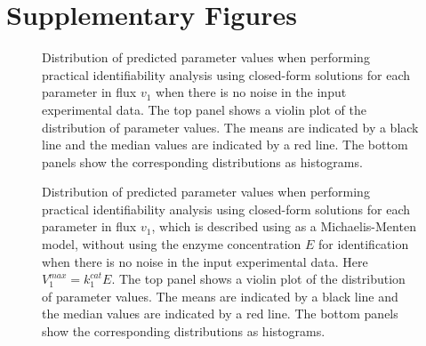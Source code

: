 \documentclass[10pt]{article}
\begin{document}
\section{Supplementary Figures}	
\begin{figure}[!tbhp]
	\caption{Distribution of predicted parameter values when performing practical identifiability analysis using closed-form solutions for each parameter in flux $v_1$ when there is no noise in the input experimental data. The top panel shows a violin plot of the distribution of parameter values. The means are indicated by a black line and the median values are indicated by a red line. The bottom panels show the corresponding distributions as histograms.}\label{fig:v1_kcat_ck_values}
\end{figure}

\begin{figure}[!tbhp]
	\caption{Distribution of predicted parameter values when performing practical identifiability analysis using closed-form solutions for each parameter in flux $v_1$, which is described using as a Michaelis-Menten model, without using the enzyme concentration $E$ for identification when there is no noise in the input experimental data. Here $V_1^{max} = k_1^{cat}E$. The top panel shows a violin plot of the distribution of parameter values. The means are indicated by a black line and the median values are indicated by a red line. The bottom panels show the corresponding distributions as histograms.}\label{fig:v1_v1max_ck_values}
\end{figure}
\end{document}
